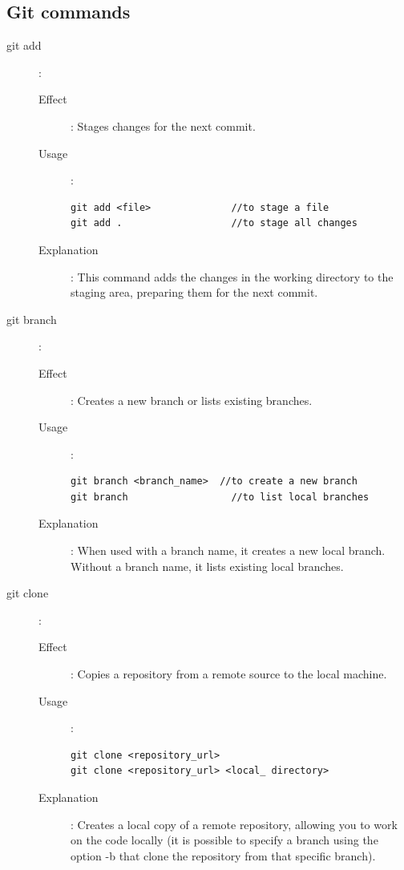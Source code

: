 \subsection{Git commands}
\begin{description}
   \item[git add]:
         \begin{description}
            \item[Effect]: Stages changes for the next commit.
            \item[Usage]:
                  \begin{verbatim}
git add <file>              //to stage a file
git add .                   //to stage all changes
            \end{verbatim}
            \item[Explanation]: This command adds the changes in the working directory to the staging area, preparing them for the next commit.
         \end{description}
   \item[git branch]:
         \begin{description}
            \item[Effect]: Creates a new branch or lists existing branches.
            \item[Usage]:
                  \begin{verbatim}
git branch <branch_name>  //to create a new branch
git branch                  //to list local branches
            \end{verbatim}
            \item[Explanation]: When used with a branch name, it creates a new local branch. Without a branch name, it lists existing local branches.
         \end{description}
   \item[git clone]:
         \begin{description}
            \item[Effect]: Copies a repository from a remote source to the local machine.
            \item[Usage]:
                  \begin{verbatim}
git clone <repository_url>
git clone <repository_url> <local_ directory>
            \end{verbatim}
            \item[Explanation]: Creates a local copy of a remote repository, allowing you to work on the code locally (it is possible to specify a branch using the option -b that clone the repository from that specific branch).

\end{description}
\end{description}
